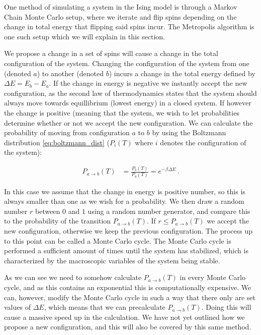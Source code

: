 \documentclass[reprint,english,notitlepage]{revtex4-1}  %
\begin{document}
One method of simulating a system in the Ising model is through a Markov Chain Monte Carlo setup, where we iterate and flip spins depending on the change in total energy that flipping said spins incur. The Metropolis algorithm \citep{Metropolis} is one such setup which we will explain in this section.

We propose a change in a set of spins will cause a change in the total configuration of the system. Changing the configuration of the system from one (denoted $a$) to another (denoted $b$) incurs a change in the total energy defined by $\Delta E = E_b - E_a$. If the change in energy is negative we instantly accept the new configuration, as the second law of thermodynamics states that the system should always move towards equillibrium (lowest energy) in a closed system. If however the change is positive (meaning that the system, we wish to let probabilities determine whether or not we accept the new configuration. We can calculate the probability of moving from configuration $a$ to $b$ by using the Boltzmann distribution \ref{eq:boltzmann_dist} ($P_i(T)$ where $i$ denotes the configuration of the system):

\begin{align*}
P_{a\to b}(T)  &= \frac{P_b (T) }{P_a (T)} = e^{-\beta \Delta E }\, . 
\end{align*}

In this case we assume that the change in energy is positive number, so this is always smaller than one as we wish for a probability. We then draw a random number $r$ between $0$ and $1$ using a random number generator, and compare this to the probability of the transition $P_{a\to b}(T)$. If $r\leq P_{a\to b} (T)$ we accept the new configuration, otherwise we keep the previous configuration. The process up to this point can be called a Monte Carlo cycle. The Monte Carlo cycle is performed a sufficient amount of times until the system has stabilized, which is characterized by the macroscopic variables of the system being stable.

As we can see we need to somehow calculate $P_{a\to b} (T)$ in every Monte Carlo cycle, and as this contains an exponential this is computationally expensive. We can, however, modify the Monte Carlo cycle in such a way that there only are set values of $\Delta E$, which means that we can precalculate $P_{a\to b} (T)$. Doing this will cause a massive speed up in the calculation. We have not yet outlined how we propose a new configuration, and this will also be covered by this same method.
\end{document}
